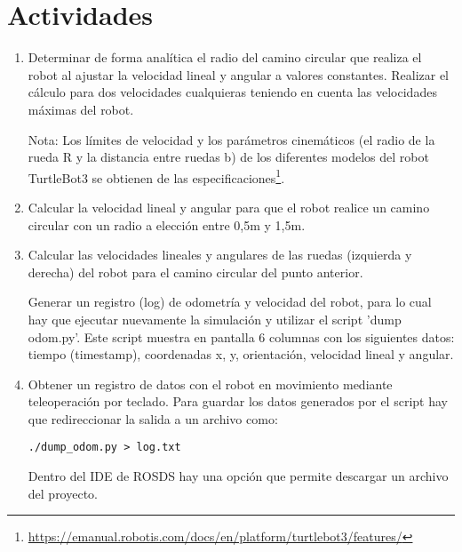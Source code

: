 \documentclass[tp]{lcc}
\begin{document}
\section{Actividades}
\begin{enumerate}
\item  Determinar de forma analítica el radio del camino circular que realiza el robot al ajustar la velocidad lineal y angular a valores constantes. Realizar el cálculo para dos velocidades cualquieras teniendo en cuenta las velocidades máximas del robot.

Nota: Los límites de velocidad y los parámetros cinemáticos (el radio de la rueda R y la distancia
entre ruedas b) de los diferentes modelos del robot TurtleBot3 se obtienen de las especificaciones\footnote{\url{https://emanual.robotis.com/docs/en/platform/turtlebot3/features/}}.

\item  Calcular la velocidad lineal y angular para que el robot realice un camino circular con un radio a
elección entre 0,5m y 1,5m.

\item  Calcular las velocidades lineales y angulares de las ruedas (izquierda y derecha) del robot para el camino circular del punto anterior.

Generar un registro (log) de odometría y velocidad del robot, para lo cual hay que ejecutar nuevamente
la simulación y utilizar el script ’dump odom.py’. Este script muestra en pantalla 6 columnas con los
siguientes datos: tiempo (timestamp), coordenadas x, y, orientación, velocidad lineal y angular.

\item Obtener un registro de datos con el robot en movimiento mediante teleoperación por teclado. Para
guardar los datos generados por el script hay que redireccionar la salida a un archivo como:

\begin{lstlisting}[style=bash] 
./dump_odom.py > log.txt
\end{lstlisting}

Dentro del IDE de ROSDS hay una opción que permite descargar un archivo del proyecto.


\end{enumerate}
\end{document}
